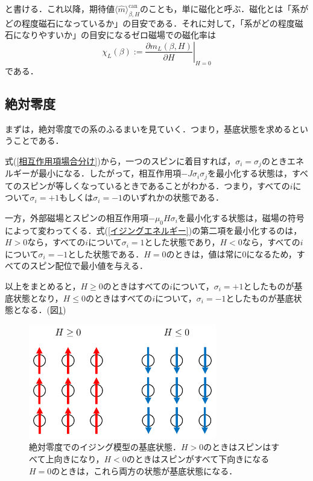 \documentclass[a4paper,11pt]{jsreport}
\begin{document}
と書ける．これ以降，期待値$\langle \hat{m} \rangle_{\beta, H}^{\text{can}}$のことも，単に磁化と呼ぶ．磁化とは「系がどの程度磁石になっているか」の目安である．それに対して，「系がどの程度磁石になりやすいか」の目安になるゼロ磁場での磁化率は
\begin{equation}
  \chi_L(\beta) := \left.\frac{\partial m_L(\beta, H)}{\partial H}\right|_{H=0}
\end{equation}
である．
\subsection{絶対零度}
まずは，絶対零度での系のふるまいを見ていく．つまり，基底状態を求めるということである．\par
式(\ref{相互作用項場合分け})から，一つのスピンに着目すれば，$\sigma_i = \sigma_j$のときエネルギーが最小になる．したがって，相互作用項$-J\sigma_i \sigma_j$を最小化する状態は，すべてのスピンが等しくなっているときであることがわかる．つまり，すべての$i$について$\sigma_i = +1$もしくは$\sigma_i = -1$のいずれかの状態である．\par
一方，外部磁場とスピンの相互作用項$-\mu_0 H \sigma_i$を最小化する状態は，磁場の符号によって変わってくる．式(\ref{イジングエネルギー})の第二項を最小化するのは，$H>0$なら，すべての$i$について$\sigma_i=1$とした状態であり，$H<0$なら，すべての$i$について$\sigma_i=-1$とした状態である．$H=0$のときは，値は常に$0$になるため，すべてのスピン配位で最小値を与える．\par
以上をまとめると，$H \geq 0$のときはすべての$i$について，$\sigma_i=+1$としたものが基底状態となり，$H \leq 0$のときはすべての$i$について，$\sigma_i=-1$としたものが基底状態となる．(図\ref{絶対零度スピン配位})\par
\begin{figure}[H]
  \begin{center}
    \includegraphics[height=5cm]{image/絶対零度スピン配位.png}
    \caption{絶対零度でのイジング模型の基底状態．$H>0$のときはスピンはすべて上向きになり，$H<0$のときはスピンがすべて下向きになる$H=0$のときは，これら両方の状態が基底状態になる． \label{絶対零度スピン配位}}
  \end{center}
\end{figure}
\end{document}
